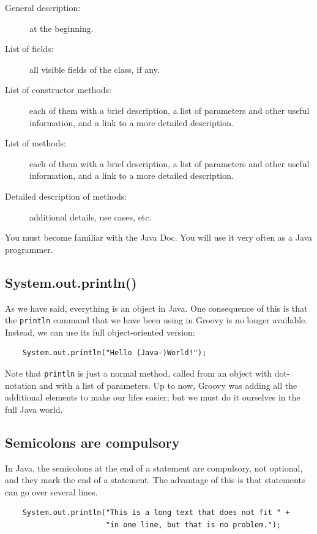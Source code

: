 \begin{description}
\item[General description:] at the beginning.
\item[List of fields:] all visible fields of the class, if any.
\item[List of constructor methods:] each of them with a brief
  description, a list of parameters and other useful information, and
  a link to a more detailed description.
\item[List of methods:] each of them with a brief
  description, a list of parameters and other useful information, and
  a link to a more detailed description.
\item[Detailed description of methods:] additional details, use cases,
  etc. 
\end{description}

You must become familiar with the Java Doc. You will use it very often
as a Java programmer. 

\subsection{System.out.println()}
\label{sec:system.out.println}

As we have said, everything is an object in Java. One consequence of
this is
that the \verb+println+ command that we have been using in Groovy is no
longer available. Instead, we can use its full object-oriented
version: 

\begin{verbatim}
    System.out.println("Hello (Java-)World!");
\end{verbatim}

Note that \verb+println+ is just a normal method, called from an
object with dot-notation and with a list of parameters.
Up to now, Groovy was adding all the additional elements to make our
lifes easier; but we must do it ourselves in the full Java world. 

\subsection{Semicolons are compulsory}
\label{sec:semic-are-comp}

In Java, the semicolons at the end of a statement are compulsory, not
optional, and they mark the end of a statement. 
The advantage of this is that statements can go over several lines. 

\begin{verbatim}
    System.out.println("This is a long text that does not fit " + 
                       "in one line, but that is no problem.");
\end{verbatim}

